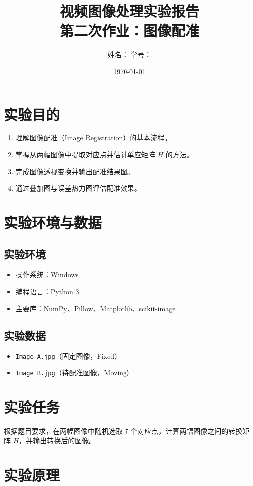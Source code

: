 \documentclass[UTF8,a4paper,12pt]{ctexart}
\title{视频图像处理实验报告\\第二次作业：图像配准}
\author{姓名：\underline{\hspace{3cm}} \quad 学号：\underline{\hspace{3cm}}}
\date{\today}
\begin{document}
\maketitle
\tableofcontents
\newpage

\section{实验目的}
\begin{enumerate}
  \item 理解图像配准（Image Registration）的基本流程。
  \item 掌握从两幅图像中提取对应点并估计单应矩阵 $H$ 的方法。
  \item 完成图像透视变换并输出配准结果图。
  \item 通过叠加图与误差热力图评估配准效果。
\end{enumerate}

\section{实验环境与数据}
\subsection{实验环境}
\begin{itemize}
  \item 操作系统：Windows
  \item 编程语言：Python 3
  \item 主要库：NumPy、Pillow、Matplotlib、scikit-image
\end{itemize}

\subsection{实验数据}
\begin{itemize}
  \item \texttt{Image A.jpg}（固定图像，Fixed）
  \item \texttt{Image B.jpg}（待配准图像，Moving）
\end{itemize}

\section{实验任务}
根据题目要求，在两幅图像中随机选取 7 个对应点，计算两幅图像之间的转换矩阵 $H$，并输出转换后的图像。

\section{实验原理}
\end{document}
